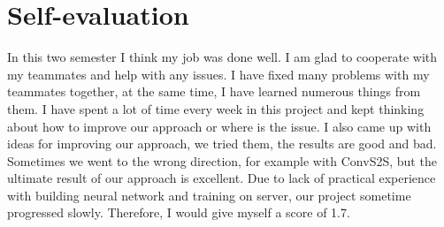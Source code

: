 
\section{Self-evaluation}

In this two semester I think my job was done well. 
I am glad to cooperate with my teammates and help with any issues. 
I have fixed many problems with my teammates together,
at the same time, I have learned numerous things from them. 
I have spent a lot of time every week in this project
and kept thinking about 
how to improve our approach
or where is the issue. 
I also came up with ideas for improving our approach, 
we tried them, the results are good and bad.
Sometimes we went to the wrong direction, for example with ConvS2S, 
but the ultimate result of our approach is excellent. 
Due to lack of practical experience with building neural network and training on server, 
our project sometime progressed slowly. 
Therefore, I would give myself a score of 1.7. 
